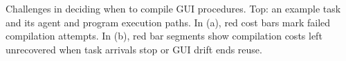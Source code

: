 \caption{Challenges in deciding when to compile GUI procedures.
Top: an example task and its agent and program execution paths.
In (a), red cost bars mark failed compilation attempts.
In (b), red bar segments show compilation costs left unrecovered when task arrivals stop or GUI drift ends reuse.}
